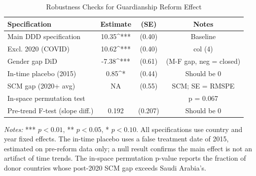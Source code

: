 \begin{table}[htbp]
\centering
\caption{Robustness Checks for Guardianship Reform Effect}
\label{tab:robustness}
\begin{tabular}{lccc}
\hline\hline
Specification & Estimate & (SE) & Notes \\
\hline
Main DDD specification & 10.35^{***} & (0.40) & Baseline \\
Excl. 2020 (COVID) & 10.62^{***} & (0.40) & col (4) \\
Gender gap DiD & -7.38^{***} & (0.61) & (M-F gap, neg = closed) \\
In-time placebo (2015) & 0.85^{*} & (0.44) & Should be 0 \\
SCM gap (2020+ avg) & NA & (0.55) & SCM; SE = RMSPE \\
\hline
In-space permutation test & & & p = 0.067 \\
Pre-trend F-test (slope diff.) & 0.192 & (0.207) & Should be 0 \\
\hline\hline
\end{tabular}
\begin{minipage}{0.95\textwidth}
{\footnotesize \textit{Notes:} *** $p<0.01$, ** $p<0.05$, * $p<0.10$. All specifications use country and year fixed effects. The in-time placebo uses a false treatment date of 2015, estimated on pre-reform data only; a null result confirms the main effect is not an artifact of time trends. The in-space permutation p-value reports the fraction of donor countries whose post-2020 SCM gap exceeds Saudi Arabia's.}
\end{minipage}
\end{table}
